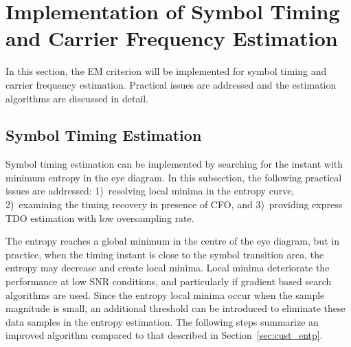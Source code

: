 \documentclass[12pt, draftclsnofoot, onecolumn]{IEEEtran}
\begin{document}
\section{Implementation of Symbol Timing and Carrier Frequency Estimation}
\label{sec:imple}
In this section, the EM criterion will be implemented for symbol timing and carrier frequency estimation.
Practical issues are addressed and the estimation algorithms are discussed in detail. 

\subsection{Symbol Timing Estimation} 
\label{sec:timing}
Symbol timing estimation can be implemented by searching for the instant with minimum entropy in the eye diagram.
In this subsection, the following practical issues are addressed:
1)~resolving local minima in the entropy curve,  
2)~examining the timing recovery in presence of CFO, and 
3)~providing express TDO estimation with low oversampling rate.

The entropy reaches a global minimum in the centre of the eye diagram, but in practice, when the timing instant is close to the symbol transition area, the entropy may decrease and create local minima. 
Local minima deteriorate the performance at low SNR conditions, and particularly if gradient based search algorithms are used.
Since the entropy local minima occur when the sample magnitude is small, 
an additional threshold can be introduced to eliminate these data samples in the entropy estimation.
The following steps summarize an improved algorithm compared to that described in Section~\ref{sec:cust_entp}.
\end{document}
